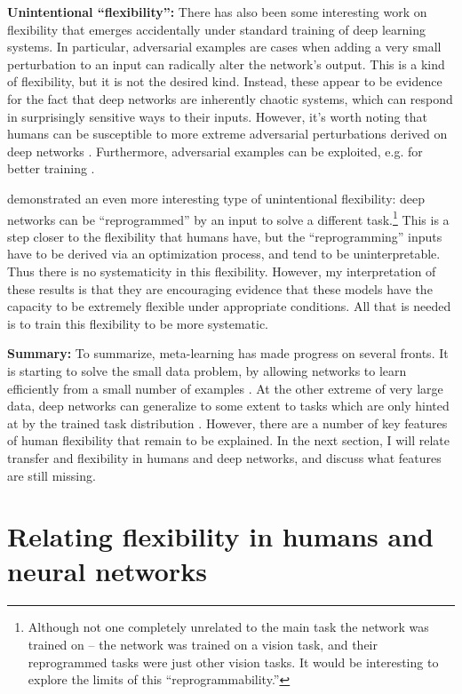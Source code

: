 \textbf{Unintentional ``flexibility'':} There has also been some interesting work on flexibility that emerges accidentally under standard training of deep learning systems. In particular, adversarial examples \citep{SzegedyAdv} are cases when adding a very small perturbation to an input can radically alter the network's output. This is a kind of flexibility, but it is not the desired kind. Instead, these appear to be evidence for the fact that deep networks are inherently chaotic systems, which can respond in surprisingly sensitive ways to their inputs. However, it's worth noting that humans can be susceptible to more extreme adversarial perturbations derived on deep networks \citep{Elsayed2018}. Furthermore, adversarial examples can be exploited, e.g. for better training \citep{Goodfellow2015}. \par 
\citet{Elsayed} demonstrated an even more interesting type of unintentional flexibility: deep networks can be ``reprogrammed'' by an input to solve a different task.\footnote{Although not one completely unrelated to the main task the network was trained on -- the network was trained on a vision task, and their reprogrammed tasks were just other vision tasks. It would be interesting to explore the limits of this ``reprogrammability.''} This is a step closer to the flexibility that humans have, but the ``reprogramming'' inputs have to be derived via an optimization process, and tend to be uninterpretable. Thus there is no systematicity in this flexibility. However, my interpretation of these results is that they are encouraging evidence that these models have the capacity to be extremely flexible under appropriate conditions. All that is needed is to train this flexibility to be more systematic. \par  
\textbf{Summary:} To summarize, meta-learning has made progress on several fronts. It is starting to solve the small data problem, by allowing networks to learn efficiently from a small number of examples \citep[e.g.][]{Wang2016a}. At the other extreme of very large data, deep networks can generalize to some extent to tasks which are only hinted at by the trained task distribution \citep[e.g.][]{Radford2019}. However, there are a number of key features of human flexibility that remain to be explained. In the next section, I will relate transfer and flexibility in humans and deep networks, and discuss what features are still missing. \par 

\section{Relating flexibility in humans and neural networks}

